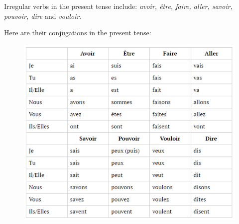 \documentclass[11pt, oneside]{book}
\begin{document}
\newpage

Irregular verbs in the present tense include: \textit{avoir, \^etre, faire, aller, savoir, pouvoir, dire} and \textit{vouloir}. 

	Here are their conjugations in the present tense: 
	
	\begin{figure}[H]
	\includegraphics[scale=0.75]{charts/presentIrregular.png}
	\end{figure}
\end{document}
